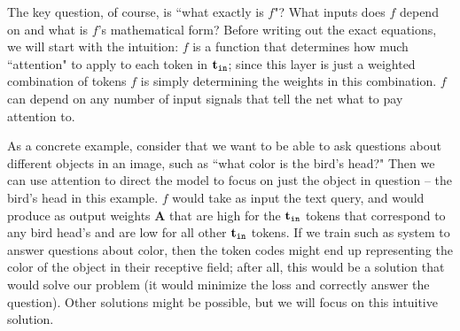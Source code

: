 The key question, of course, is ``what exactly is $f$"? What inputs does $f$ depend on and what is $f$'s mathematical form? Before writing out the exact equations, we will start with the intuition: $f$ is a function that determines how much ``attention" to apply to each token in $\mathbf{t}_{\texttt{in}}$; since this layer is just a weighted combination of tokens $f$ is simply determining the weights in this combination. $f$ can depend on any number of input signals that tell the net what to pay attention to.%

As a concrete example, consider that we want to be able to ask questions about different objects in an image, such as ``what color is the bird's head?" Then we can use attention to direct the model to focus on just the object in question -- the bird's head in this example. $f$ would take as input the text query, and would produce as output weights $\mathbf{A}$ that are high for the $\mathbf{t}_{\texttt{in}}$ tokens that correspond to any bird head's and are low for all other $\mathbf{t}_{\texttt{in}}$ tokens. If we train such as system to answer questions about color, then the token codes might end up representing the color of the object in their receptive field; after all, this would be a solution that would solve our problem (it would minimize the loss and correctly answer the question). Other solutions might be possible, but we will focus on this intuitive solution.

